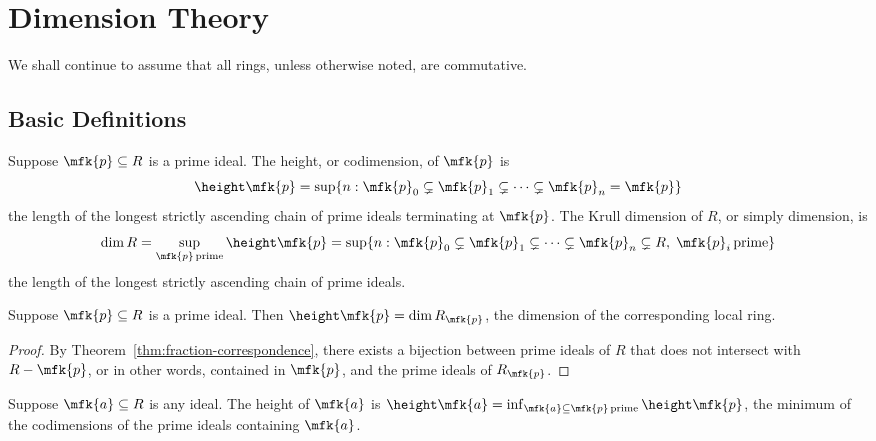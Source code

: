 \chapter{Dimension Theory}

\begin{remark}
    We shall continue to assume that all rings,
    unless otherwise noted, are commutative.
\end{remark}

\section{Basic Definitions}

\begin{definition}
    Suppose \(\mfk{p} \subseteq R\) is a prime ideal.
    The height, or codimension, of \(\mfk{p}\) is
    \begin{equation*}
        \height\mfk{p} = \sup\{n: \mfk{p}_0 \subsetneq \mfk{p}_1 \subsetneq \cdots \subsetneq \mfk{p}_n = \mfk{p}\}
    \end{equation*}
    the length of the longest strictly ascending chain of prime ideals terminating at \(\mfk{p}\).
    The Krull dimension of \(R\), or simply dimension, is
    \begin{equation*}
        \dim R = \sup_{\mfk{p}\,\text{prime}}\height\mfk{p}
        = \sup\{n: \mfk{p}_0 \subsetneq \mfk{p}_1 \subsetneq \cdots \subsetneq \mfk{p}_n \subsetneq R, \; \mfk{p}_i\,\text{prime}\}
    \end{equation*}
    the length of the longest strictly ascending chain of prime ideals.
\end{definition}
\begin{lemma}
    Suppose \(\mfk{p} \subseteq R\) is a prime ideal.
    Then \(\height\mfk{p} = \dim R_\mfk{p}\), the dimension of the corresponding local ring.
\end{lemma}
\begin{proof}
    By Theorem~\ref{thm:fraction-correspondence},
    there exists a bijection between prime ideals of \(R\) that does not intersect with \(R-\mfk{p}\),
    or in other words, contained in \(\mfk{p}\),
    and the prime ideals of \(R_\mfk{p}\).
\end{proof}
\begin{definition}
    Suppose \(\mfk{a} \subseteq R\) is any ideal.
    The height of \(\mfk{a}\) is \(\height\mfk{a} = \inf_{\mfk{a}\subseteq\mfk{p}\,\text{prime}}\height\mfk{p}\),
    the minimum of the codimensions of the prime ideals containing \(\mfk{a}\).
\end{definition}


